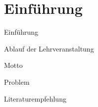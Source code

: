 \section{Einführung}\label{sec:0-einfuehrung}
\begin{frame}{Einführung}
\end{frame}


\begin{frame}{Ablauf der Lehrveranstaltung}
\end{frame}

\begin{frame}{Motto}
\end{frame}

\begin{frame}{Problem}
\end{frame}

\begin{frame}{Literaturempfehlung}
\end{frame}